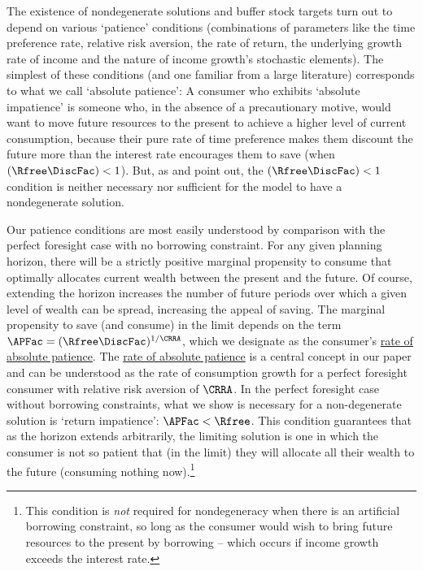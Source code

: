 \documentclass[BufferStockTheory]{subfiles}
\begin{document}
The existence of nondegenerate solutions and buffer stock targets turn out to depend on various `patience' conditions (combinations of parameters like the time preference rate, relative risk aversion, the rate of return, the underlying growth rate of income and the nature of income growth's stochastic elements).  The simplest of these conditions (and one familiar from a large literature) corresponds to what we call `absolute patience':  A consumer who exhibits `absolute impatience' is someone who, in the absence of a precautionary motive, would want to move future resources to the present to achieve a higher level of current consumption, because their pure rate of time preference makes them discount the future more than the interest rate encourages them to save (when $(\Rfree \DiscFac)<1$).  But, as \cite{szeidlInvariant} and \cite{maUnboundedDP} point out, the $(\Rfree \DiscFac)<1$ condition is neither necessary nor sufficient for the model to have a nondegenerate solution.  %

Our patience conditions are most easily understood by comparison with the perfect foresight case with no borrowing constraint.  For any given planning horizon, there will be a strictly positive marginal propensity to consume that optimally allocates current wealth between the present and the future.  Of course, extending the horizon increases the number of future periods over which a given level of wealth can be spread, increasing the appeal of saving. The marginal propensity to save (and consume) in the limit depends on the term $\APFac=(\Rfree \DiscFac)^{1/\CRRA}$, which we designate as the consumer's \hyperlink{APFAC}{rate of absolute patience}. The \hyperlink{APFAC}{rate of absolute patience} is a central concept in our paper and can be understood as the rate of consumption growth for a perfect foresight consumer with relative risk aversion of $\CRRA$. In the perfect foresight case without borrowing constraints, what we show is necessary for a non-degenerate solution is `return impatience': $\APFac < \Rfree$. This condition guarantees that as the horizon extends arbitrarily, the limiting solution is one in which the consumer is not so patient that (in the limit) they will allocate all their wealth to the future (consuming nothing now).\footnote{This condition is \textit{not} required for nondegeneracy when there is an artificial borrowing constraint, so long as the consumer would wish to bring future resources to the present by borrowing -- which occurs if income growth exceeds the interest rate.}
\end{document}
